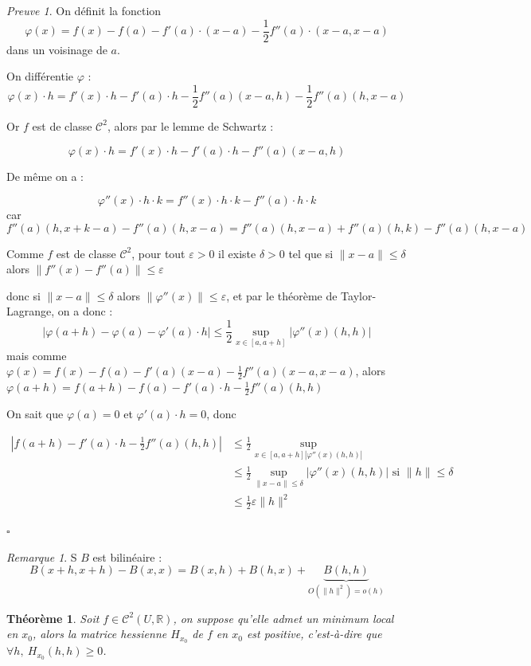 \documentclass[]{article}
\newtheorem{mythm}{Théorème}
\theoremstyle{remark}
\newtheorem{myrem}{Remarque}
\newtheorem{myproof}{Preuve}
\theoremstyle{definition}
\newcommand{\cqfd}{
	\hfill$\square$
}
\begin{document}
\begin{myproof}
	On définit la fonction $$\varphi(x) = f(x) - f(a) - f'(a) \cdot (x-a) - \frac{1}{2} f''(a)\cdot(x-a, x-a)$$ dans un voisinage de $a$.
	
	On différentie $\varphi$ :
	$$\varphi(x) \cdot h = f'(x) \cdot h- f'(a) \cdot h - \frac{1}{2}f''(a)(x-a, h)- \frac{1}{2}f''(a)(h, x-a)$$
	
	Or $f$ est de classe $\mathcal{C}^2$, alors par le lemme de Schwartz :
	
	$$\varphi(x) \cdot h = f'(x) \cdot h- f'(a) \cdot h - f''(a)(x-a, h)$$
	
	De même on a :
	
	$$\varphi''(x)\cdot h \cdot k= f''(x) \cdot h \cdot k - f''(a)\cdot h \cdot k$$
	car $$f''(a) (h, x+k-a) - f''(a)(h, x-a) = f''(a)(h, x-a) + f''(a)(h, k) - f''(a)(h, x-a)$$
	
	Comme $f$ est de classe $\mathcal{C}^2$, pour tout $\varepsilon > 0$ il existe $\delta > 0$ tel que si $\|x-a\| \leqslant \delta$ alors $\|f''(x)-f''(a)\| \leqslant \varepsilon$
	
	donc si $\|x-a\|\leqslant \delta$ alors $\|\varphi''(x)\| \leqslant \varepsilon$, et par le théorème de Taylor-Lagrange, on a donc :
	$$|\varphi(a+h) - \varphi(a) - \varphi'(a)\cdot h| \leqslant \frac{1}{2} \sup_{x \in [a, a+h]} |\varphi''(x)(h, h)|$$
	mais comme $\varphi(x) = f(x) - f(a) - f'(a)(x-a) - \frac{1}{2}f''(a)(x-a, x-a)$, alors $\varphi(a+h) = f(a+h) - f(a) - f'(a) \cdot h - \frac{1}{2} f''(a)(h, h)$
	
	On sait que $\varphi(a)=0$ et $\varphi'(a) \cdot h = 0$, donc
	
	$$\begin{aligned}
		|f(a+h) - f'(a) \cdot h - \frac{1}{2} f''(a)(h, h)| &\leqslant \frac{1}{2} \sup_{x \in [a, a+h] |\varphi''(x)(h, h)|} \\
		& \leqslant \frac{1}{2} \sup_{\|x-a\| \leqslant \delta} |\varphi''(x)(h, h)| \text{ si } \|h\| \leqslant \delta \\
		&\leqslant \frac{1}{2} \varepsilon \|h\|^2
	\end{aligned}$$
	\cqfd
\end{myproof}

\begin{myrem}
	S $B$ est bilinéaire :
	$$B(x+h, x+h) - B(x, x) = B(x, h) + B(h, x) + \underbrace{B(h, h)}_{O(\|h\|^2) = o(h)}$$
\end{myrem}

\begin{mythm}
	Soit $f \in \mathcal{C}^2(U, \mathbb{R})$, on suppose qu'elle admet un minimum local en $x_0$, alors la matrice hessienne $H_{x_0}$ de $f$ en $x_0$ est positive, c'est-à-dire que $\forall h, ~ H_{x_0}(h, h) \geqslant 0$.
\end{mythm}
\end{document}
